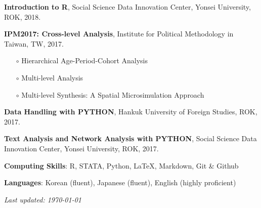 \documentclass[margin,line]{res}
\begin{document}
\begin{resume}
\vspace{-.1cm}

{\bf Introduction to R}, Social Science Data Innovation Center, Yonsei University, ROK, 2018.

\vspace{-.1cm}

{\bf IPM2017: Cross-level Analysis}, Institute for Political Methodology in Taiwan, TW, 2017.
\vspace{-.4cm}
\begin{itemize} \itemsep -1mm 
	\item[$\circ$] Hierarchical Age-Period-Cohort Analysis
	\item[$\circ$] Multi-level Analysis
	\item[$\circ$] Multi-level Synthesis: A Spatial Microsimulation Approach
\end{itemize}

{\bf Data Handling with PYTHON}, Hankuk University of Foreign Studies, ROK, 2017.

\vspace{-.1cm}

{\bf Text Analysis and Network Analysis with PYTHON}, Social Science Data Innovation Center, Yonsei University, ROK, 2017.
\vspace{-.1cm}

{\bf Computing Skills}: R, STATA, Python, \LaTeX, Markdown, Git \& Github

\vspace*{-3mm}
{\bf Languages}:  Korean (fluent), Japanese (fluent), English (highly proficient)


\mbox{}
\vfill
\centering \textit{Last updated: \today}


\end{resume}
\end{document}
